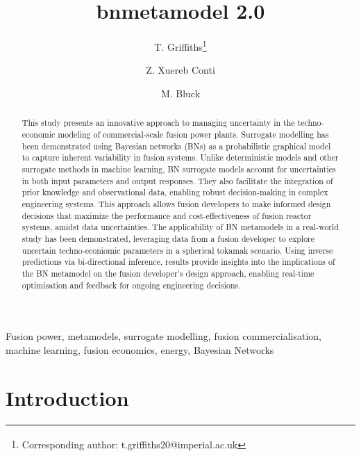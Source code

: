 \documentclass[journal]{IEEEtran}
\begin{document}
\title{bnmetamodel 2.0}

\author[1]{T. Griffiths\thanks{\textsuperscript{\Cross}Corresponding author: t.griffiths20@imperial.ac.uk}}
\author[2]{Z. Xuereb Conti}
\author[1]{M. Bluck}

\vspace{-15pt}

\maketitle

\begin{abstract}
This study presents an innovative approach to managing uncertainty in the techno-economic modeling of commercial-scale fusion power plants. Surrogate modelling has been demonstrated using Bayesian networks (BNs) as a probabilistic graphical model to capture inherent variability in fusion systems. Unlike deterministic models and other surrogate methods in machine learning, BN surrogate models account for uncertainties in both input parameters and output responses. They also facilitate the integration of prior knowledge and observational data, enabling robust decision-making in complex engineering systems. This approach allows fusion developers to make informed design decisions that maximize the performance and cost-effectiveness of fusion reactor systems, amidst data uncertainties. The applicability of BN metamodels in a real-world study has been demonstrated, leveraging data from a fusion developer to explore uncertain techno-econiomic parameters in a spherical tokamak scenario. Using inverse predictions via bi-directional inference, results provide insights into the implications of the BN metamodel on the fusion developer's design approach, enabling real-time optimisation and feedback for ongoing engineering decisions. 
\end{abstract}

\begin{IEEEkeywords}
Fusion power, metamodels, surrogate modelling, fusion commercialisation, machine learning, fusion economics, energy, Bayesian Networks
\end{IEEEkeywords}
\vspace{-2ex}

\section{Introduction}
\end{document}
